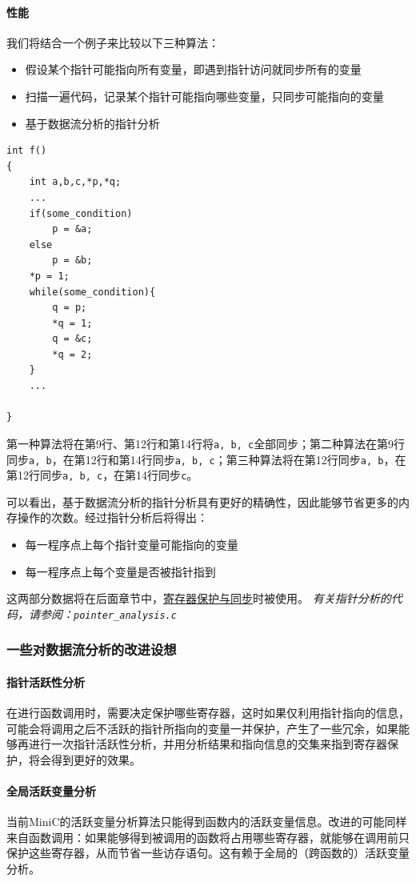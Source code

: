 \paragraph*{性能}
我们将结合一个例子来比较以下三种算法：
\begin{itemize}
	\item 假设某个指针可能指向所有变量，即遇到指针访问就同步所有的变量
	\item 扫描一遍代码，记录某个指针可能指向哪些变量，只同步可能指向的变量
	\item 基于数据流分析的指针分析
\end{itemize}
\begin{lstlisting}
int f()
{
	int a,b,c,*p,*q;
	...
	if(some_condition)
		p = &a;
	else
		p = &b;
	*p = 1;
	while(some_condition){
		q = p;
		*q = 1;
		q = &c;
		*q = 2;
	}
	...

}
\end{lstlisting}
第一种算法将在第9行、第12行和第14行将\verb|a, b, c|全部同步；第二种算法在第9行同步\verb|a, b|，在第12行和第14行同步\verb|a, b, c|；第三种算法将在第12行同步\verb|a, b|，在第12行同步\verb|a, b, c|，在第14行同步\verb|c|。

可以看出，基于数据流分析的指针分析具有更好的精确性，因此能够节省更多的内存操作的次数。经过指针分析后将得出：
\begin{itemize}
	\item 每一程序点上每个指针变量可能指向的变量
	\item 每一程序点上每个变量是否被指针指到
\end{itemize}
这两部分数据将在后面章节中，\hyperref[registerprotect]{寄存器保护与同步}时被使用。
{\it \anchor 有关指针分析的代码，请参阅：\verb|pointer_analysis.c|}\\

\subsubsection{一些对数据流分析的改进设想}
\paragraph*{指针活跃性分析}
在进行函数调用时，需要决定保护哪些寄存器，这时如果仅利用指针指向的信息，可能会将调用之后不活跃的指针所指向的变量一并保护，产生了一些冗余，如果能够再进行一次指针活跃性分析，并用分析结果和指向信息的交集来指到寄存器保护，将会得到更好的效果。
\paragraph*{全局活跃变量分析}
当前MiniC的活跃变量分析算法只能得到函数内的活跃变量信息。改进的可能同样来自函数调用：如果能够得到被调用的函数将占用哪些寄存器，就能够在调用前只保护这些寄存器，从而节省一些访存语句。这有赖于全局的（跨函数的）活跃变量分析。
